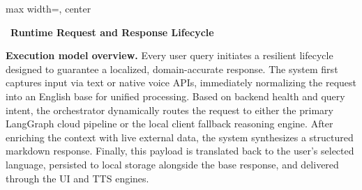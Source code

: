 \documentclass[10pt,a4paper]{article}
\begin{document}
\begin{adjustbox}{max width=\textwidth, center}
\end{adjustbox}

\clearpage

{\Large \textnormal{\faExchange}\ \bfseries Runtime Request and Response Lifecycle}

\vspace{3mm}
\textbf{Execution model overview.}
Every user query initiates a resilient lifecycle designed to guarantee a localized, domain-accurate response. The system first captures input via text or native voice APIs, immediately normalizing the request into an English base for unified processing. Based on backend health and query intent, the orchestrator dynamically routes the request to either the primary LangGraph cloud pipeline or the local client fallback reasoning engine. After enriching the context with live external data, the system synthesizes a structured markdown response. Finally, this payload is translated back to the user's selected language, persisted to local storage alongside the base response, and delivered through the UI and TTS engines.
\end{document}
